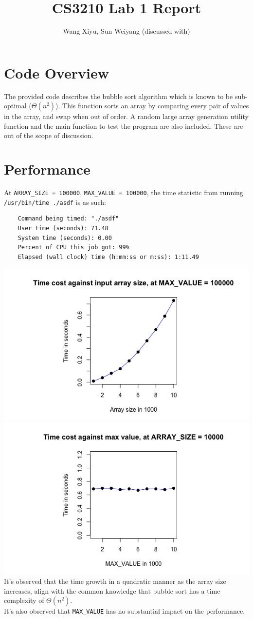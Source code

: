 \documentclass[a4paper]{article}
\begin{document}
\title{CS3210 Lab 1 Report}
\author{
  Wang Xiyu, Sun Weiyang (discussed with)
}
\maketitle
\par\vspace{-2em}
\section{Code Overview}
\par\vspace{-0.5em}
The provided code describes the bubble sort algorithm which is known to be sub-optimal ($\Theta(n^2)$).
This function sorts an array by comparing every pair of values in the array, and swap when out of order.
A random large array generation utility function and the main function to test the program are also included. These are out of the scope of discussion.
\par\vspace{-1em}
\section{Performance}
\par\vspace{-0.5em}
At \texttt{ARRAY\_SIZE = 100000}, \texttt{MAX\_VALUE = 100000}, the time statistic from running \texttt{/usr/bin/time ./asdf} is as such:
\begin{lstlisting}
    Command being timed: "./asdf"
    User time (seconds): 71.48
    System time (seconds): 0.00
    Percent of CPU this job got: 99%
    Elapsed (wall clock) time (h:mm:ss or m:ss): 1:11.49
\end{lstlisting}
\noindent
\includegraphics[width=0.49\columnwidth]{000030.png}%
\hfill
\includegraphics[width=0.49\columnwidth]{000058.png}
It's observed that the time growth in a quadratic manner as the array size increases, align with the common knowledge that bubble sort has a time complexity of $\Theta(n^2)$.\\
It's also observed that \texttt{MAX\_VALUE} has no substantial impact on the performance.
\par\vspace{-1em}
\end{document}
